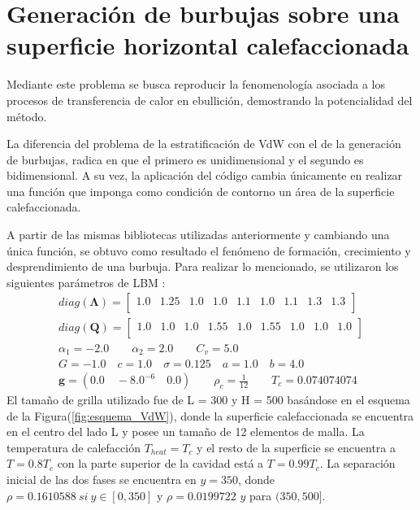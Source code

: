 \newpage
\newpage
\section{Generación de burbujas sobre una superficie horizontal calefaccionada}

Mediante este problema se busca reproducir la fenomenología asociada a los procesos de transferencia de calor en ebullición, demostrando la potencialidad del método. 

La diferencia del problema de la estratificación de VdW con el de la generación de burbujas, radica en que el primero es unidimensional y el segundo es bidimensional. A su vez, la aplicación del código cambia únicamente en realizar una función que imponga como condición de contorno un área de la superficie calefaccionada.

A partir de las mismas bibliotecas utilizadas anteriormente y cambiando una única función, se obtuvo como resultado el fenómeno de formación, crecimiento y desprendimiento de una burbuja. Para realizar lo mencionado, se utilizaron los siguientes parámetros de LBM :
{\footnotesize \begin{align*}
diag(\mathbf{\Lambda}) = 
\begin{bmatrix}
1.0 & 1.25 & 1.0 & 1.0 & 1.1 & 1.0 & 1.1 & 1.3 & 1.3 \\
\end{bmatrix}\\
diag(\mathbf{Q}) = 
\begin{bmatrix}
1.0 & 1.0 & 1.0 & 1.55 & 1.0 & 1.55 & 1.0 & 1.0 & 1.0 \\
\end{bmatrix}\\
\alpha_{1} = -2.0 \qquad 	\alpha_{2} = 2.0 \qquad C_{v} = 5.0\\
G = -1.0 \quad c = 1.0 \quad \sigma = 0.125 \quad a = 1.0 \quad b = 4.0 \\
\mathbf{g} = (0.0 \quad -8.0^{-6} \quad 0.0 ) \qquad \rho_c = \frac{1}{12} \qquad T_c = 0.074074074
\end{align*}}
El tamaño de grilla utilizado fue de L = 300 y H = 500 basándose en el esquema de la Figura(\ref{fig:esquema_VdW}), donde la superficie calefaccionada se encuentra en el centro del lado L y posee un tamaño de 12 elementos de malla. La temperatura de calefacción $T_{heat} = T_c$  y el resto de la superficie se encuentra a $T = 0.8 T_c$ con la parte superior de la cavidad está a $T = 0.99 T_c$. La separación inicial de las dos fases se encuentra en $y = 350$, donde $\rho = 0.1610588 \> si \> y \in [0,350]$ y $\rho = 0.0199722$ $y$ para $(350,500]$.

